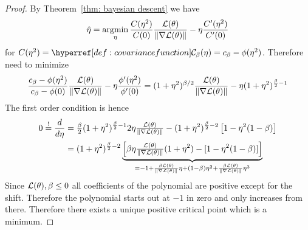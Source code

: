 

\begin{proof}
	By Theorem~\ref{thm: bayesian descent}	we have
	\begin{equation*}
		\hat{\eta}	
		= \operatorname*{argmin}_{\eta}\frac{C(\eta^2)}{C(0)} \frac{\mathcal{L}(\theta)}{\|\nabla\mathcal{L}(\theta)\|}
		-  \eta\frac{C'(\eta^2)}{C'(0)}
	\end{equation*}
	for \(\sqC(\lr^2) = \C_\beta(\lr) = c_\beta - \phi(\lr^2)\). Therefore need
	to minimize
	\begin{equation*}
		\frac{c_\beta - \phi(\eta^2)}{c_\beta - \phi(0)}
		\frac{\mathcal{L}(\theta)}{\|\nabla\mathcal{L}(\theta)\|}
		- \eta\frac{\phi'(\eta^2)}{\phi'(0)}
		= (1+\eta^2)^{\beta/2} 
		\frac{\mathcal{L}(\theta)}{\|\nabla\mathcal{L}(\theta)\|}
		- \eta(1+\eta^2)^{\frac\beta2-1}\\
	\end{equation*}
	The first order condition is hence
	\begin{align*}
		0\overset!=\frac{d}{d\eta}
		&= \tfrac\beta2(1+\eta^2)^{\frac\beta2-1}2\eta 
		\tfrac{\mathcal{L}(\theta)}{\|\nabla\mathcal{L}(\theta)\|}
		- (1+\eta^2)^{\frac\beta2 -2} \left[1 - \eta^2(1-\beta)\right]\\
		&= (1+\eta^2)^{\frac\beta2-2}\underbrace{\left[
			\beta\eta\tfrac{\mathcal{L}(\theta)}{\|\nabla\mathcal{L}(\theta)\|}(1+\eta^2)
			- [1-\eta^2(1-\beta)]
		\right]}_{
			= -1 + \frac{\beta\mathcal{L}(\theta)}{\|\nabla\mathcal{L}(\theta)\|}\eta
			+(1-\beta)\eta^2 + \frac{\beta\mathcal{L}(\theta)}{\|\nabla\mathcal{L}(\theta)\|}\eta^3
		}
	\end{align*}
	Since \(\mathcal{L}(\theta), \beta\le0\) all coefficients of the polynomial
	are positive except for the shift. Therefore the polynomial starts out
	at \(-1\) in zero and only increases from there. Therefore there exists
	a unique positive critical point which is a minimum.
\end{proof}
